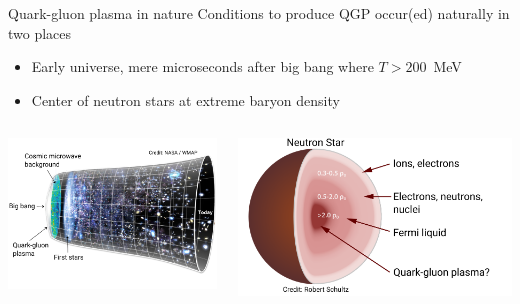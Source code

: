 \documentclass[xcolor=dvipsnames, aspectratio=169]{beamer}
\begin{document}
\begin{frame}[t]{Quark-gluon plasma in nature}
    \bigskip
    Conditions to produce QGP occur(ed) naturally in two places
    \begin{itemize}
        \item Early universe, mere microseconds after big bang where $T > 200$~MeV
        \item Center of neutron stars at extreme baryon density
    \end{itemize}
    \bigskip
    \begin{columns}[T]
    \begin{column}{0.5\textwidth}
        \centering
        \includegraphics[width=0.9\columnwidth]{bigbang.pdf}
    \end{column}
    \begin{column}{0.5\textwidth}
        \centering
        \bigskip \includegraphics[width=0.9\columnwidth]{neutronstar.pdf}
    \end{column}
    \end{columns}
\end{frame}
\end{document}
